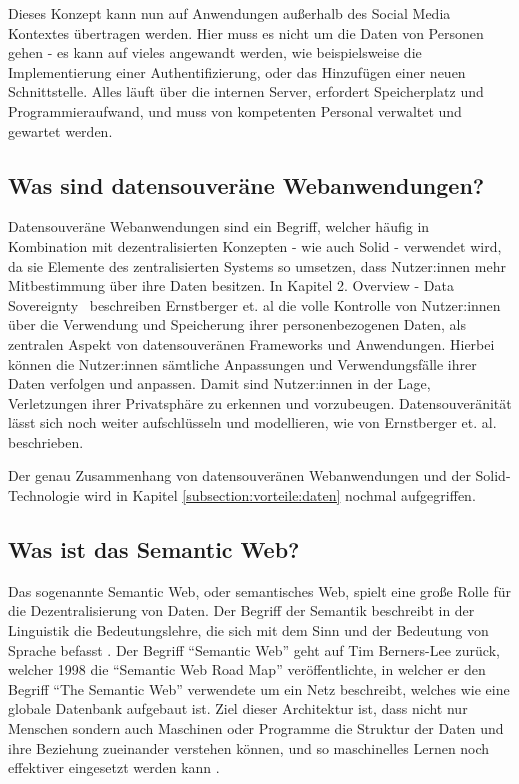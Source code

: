 \documentclass[acmtog]{acmart}
\begin{document}
Dieses Konzept kann nun auf Anwendungen außerhalb des Social Media Kontextes übertragen werden. Hier muss es nicht um die Daten von Personen gehen - es kann auf vieles angewandt werden, wie beispielsweise die Implementierung einer Authentifizierung, oder das Hinzufügen einer neuen Schnittstelle. Alles läuft über die internen Server, erfordert Speicherplatz und Programmieraufwand, und muss von kompetenten Personal verwaltet und gewartet werden.

\subsection{Was sind datensouveräne Webanwendungen?} \label{section:wasSindDatensouveräneWebanwendungen}
Datensouveräne Webanwendungen sind ein Begriff, welcher häufig in Kombination mit dezentralisierten Konzepten - wie auch Solid - verwendet wird, da sie Elemente des zentralisierten Systems so umsetzen, dass Nutzer:innen mehr Mitbestimmung über ihre Daten besitzen. In Kapitel 2. Overview - Data Sovereignty~\cite{cryptoeprint:2023/967} beschreiben Ernstberger et. al die volle Kontrolle von Nutzer:innen über die Verwendung und Speicherung ihrer personenbezogenen Daten, als zentralen Aspekt von datensouveränen Frameworks und Anwendungen. Hierbei können die Nutzer:innen sämtliche Anpassungen und Verwendungsfälle ihrer Daten verfolgen und anpassen. Damit sind Nutzer:innen in der Lage, Verletzungen ihrer Privatsphäre zu erkennen und vorzubeugen.
Datensouveränität lässt sich noch weiter aufschlüsseln und modellieren, wie von Ernstberger et. al.~\cite{cryptoeprint:2023/967} beschrieben.

Der genau Zusammenhang von datensouveränen Webanwendungen und der Solid-Technologie wird in Kapitel \ref{subsection:vorteile:daten} nochmal aufgegriffen.

\subsection{Was ist das Semantic Web?} \label{section:wasIstDasSemanticWeb}

Das sogenannte Semantic Web, oder semantisches Web, spielt eine große Rolle für die Dezentralisierung von Daten. Der Begriff der Semantik beschreibt in der Linguistik die Bedeutungslehre, die sich mit dem Sinn und der Bedeutung von Sprache befasst \cite{blumauer2006semantic}.
Der Begriff "`Semantic Web"' geht auf Tim Berners-Lee zurück, welcher 1998 die "`Semantic Web Road Map"' veröffentlichte, in welcher er den Begriff "`The Semantic Web"' verwendete um ein Netz beschreibt, welches wie eine globale Datenbank aufgebaut ist. Ziel dieser Architektur ist, dass nicht nur Menschen sondern auch Maschinen oder Programme die Struktur der Daten und ihre Beziehung zueinander verstehen können, und so maschinelles Lernen noch effektiver eingesetzt werden kann \cite{bernerslee1998semanticwebroadmap}.
\end{document}
